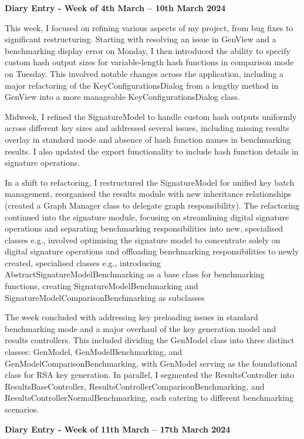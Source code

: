 \documentclass[]{final_report}
\theoremstyle{definition}
\begin{document}
\textbf{Diary Entry - Week of 4th March – 10th March 2024}

This week, I focused on refining various aspects of my project, from bug fixes to significant
restructuring. Starting with resolving an issue in GenView and a benchmarking display error on
Monday, I then introduced the ability to specify custom hash output sizes for variable-length hash
functions in comparison mode on Tuesday. This involved notable changes across the application,
including a major refactoring of the KeyConfigurationsDialog from a lengthy method in GenView into a
more manageable KeyConfigurationsDialog class.

Midweek, I refined the SignatureModel to handle custom hash outputs uniformly across different key
sizes and addressed several issues, including missing results overlay in standard mode and absence
of hash function names in benchmarking results. I also updated the export functionality to include
hash function details in signature operations.

In a shift to refactoring, I restructured the SignatureModel for unified key batch management,
reorganised the results module with new inheritance relationships (created a Graph Manager class to
delegate graph responsibility). The refactoring continued into the signature module, focusing on
streamlining digital signature operations and separating benchmarking responsibilities into new,
specialised classes e.g., involved optimising the signature model to concentrate solely on digital
signature operations and offloading benchmarking responsibilities to newly created, specialised
classes e.g., introducing AbstractSignatureModelBenchmarking as a base class for benchmarking
functions, creating SignatureModelBenchmarking and SignatureModelComparisonBenchmarking as
subclasses

The week concluded with addressing key preloading issues in standard benchmarking mode and a major
overhaul of the key generation model and results controllers. This included dividing the GenModel
class into three distinct classes: GenModel, GenModelBenchmarking, and
GenModelComparisonBenchmarking, with GenModel serving as the foundational class for RSA key
generation. In parallel, I segmented the ResultsController into ResultsBaseController,
ResultsControllerComparisonBenchmarking, and ResultsControllerNormalBenchmarking, each catering to
different benchmarking scenarios.

\textbf{Diary Entry - Week of 11th March – 17th March 2024}
\end{document}
